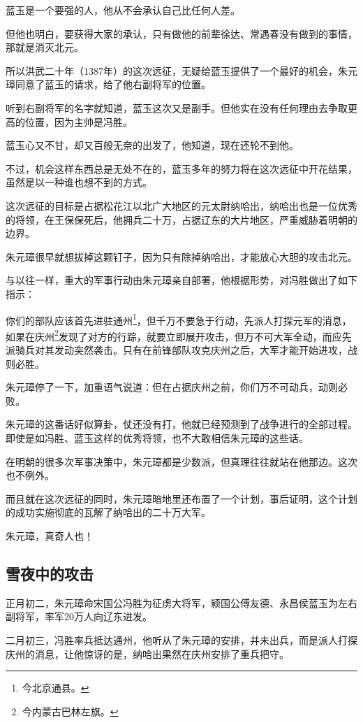 \begin{multicols}{\theparacolNo}
		蓝玉是一个要强的人，他从不会承认自己比任何人差。

		但他也明白，要获得大家的承认，只有做他的前辈徐达、常遇春没有做到的事情，那就是消灭北元。

		所以洪武二十年（1387年）的这次远征，无疑给蓝玉提供了一个最好的机会，朱元璋同意了蓝玉的请求，给了他右副将军的位置。

		听到右副将军的名字就知道，蓝玉这次又是副手。但他实在没有任何理由去争取更高的位置，因为主帅是冯胜。

		蓝玉心又不甘，却又百般无奈的出发了，他知道，现在还轮不到他。

		不过，机会这样东西总是无处不在的，蓝玉多年的努力将在这次远征中开花结果，虽然是以一种谁也想不到的方式。

		这次远征的目标是占据松花江以北广大地区的元太尉纳哈出，纳哈出也是一位优秀的将领，在王保保死后，他拥兵二十万，占据辽东的大片地区，严重威胁着明朝的边界。

		朱元璋很早就想拔掉这颗钉子，因为只有除掉纳哈出，才能放心大胆的攻击北元。

		与以往一样，重大的军事行动由朱元璋亲自部署，他根据形势，对冯胜做出了如下指示：

		你们的部队应该首先进驻通州\footnote{今北京通县。}，但千万不要急于行动，先派人打探元军的消息，如果在庆州\footnote{今内蒙古巴林左旗。}发现了对方的行踪，就要立即展开攻击，但万不可大军全动，而应先派骑兵对其发动突然袭击。只有在前锋部队攻克庆州之后，大军才能开始进攻，战则必胜。

		朱元璋停了一下，加重语气说道：但在占据庆州之前，你们万不可动兵，动则必败。

		朱元璋的这番话好似算卦，仗还没有打，他就已经预测到了战争进行的全部过程。即使是如冯胜、蓝玉这样的优秀将领，也不大敢相信朱元璋的这些话。

		在明朝的很多次军事决策中，朱元璋都是少数派，但真理往往就站在他那边。这次也不例外。

		而且就在这次远征的同时，朱元璋暗地里还布置了一个计划，事后证明，这个计划的成功实施彻底的瓦解了纳哈出的二十万大军。

		朱元璋，真奇人也！

		\subsection{雪夜中的攻击}
		正月初二，朱元璋命宋国公冯胜为征虏大将军，颍国公傅友德、永昌侯蓝玉为左右副将军，率军20万人向辽东进发。

		二月初三，冯胜率兵抵达通州，他听从了朱元璋的安排，并未出兵，而是派人打探庆州的消息，让他惊讶的是，纳哈出果然在庆州安排了重兵把守。


\end{multicols}
